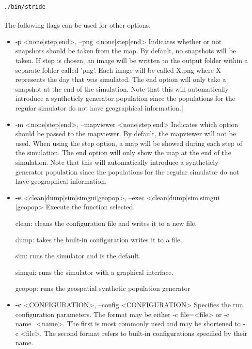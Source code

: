 \documentclass[a4paper]{article}
\begin{document}
\verb|./bin/stride|\\ \\
The following flags can be used for other options. 
\begin{itemize}
	  \item -p <none|step|end>,  --png <none|step|end>
     Indicates whether or not snapshots should be taken from the map. By
     default, no snapshots will be taken. If step is chosen, an image will
     be written to the output folder within a separate folder called 'png'.
     Each image will be called X.png where X represents the day that was
     simulated. The end option will only take a snapshot at the end of the
     simulation. Note that this will automatically introduce a syntheticly
     generator population since the populations for the regular simulator
     do not have geographical information.|

   	\item-m <none|step|end>,  --mapviewer <none|step|end>
     Indicates which option should be passed to the mapviewer. By default,
     the mapviewer will not be used. When using the step option, a map will
     be showed during each step of the simulation. The end option will only
     show the map at the end of the simulation. Note that this will
     automatically introduce a syntheticly generator population since the
     populations for the regular simulator do not have geographical
     information.

   \item \textbf{-e} <clean|dump|sim|simgui|geopop>,  --exec <clean|dump|sim|simgui
      |geopop>
     Execute the function selected.

     clean:  cleans the configuration file and writes it to a new file.

     dump:   takes the built-in configuration writes it to a file.

     sim:    runs the simulator and is the default.

     simgui: runs the simulator with a graphical interface.

     geopop: runs the geospatial synthetic population generator


   \item \textbf{-c} <CONFIGURATION>,  --config <CONFIGURATION>
     Specifies the run configuration parameters. The format may be either
     -c file=<file> or -c name=<name>. The first is most commonly used and
     may be shortened to -c <file>. The second format refers to built-in
     configurations specified by their name.


\end{itemize}
\end{document}
